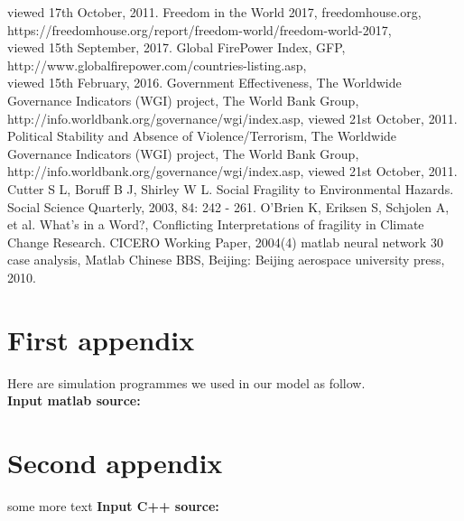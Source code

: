 \documentclass{mcmthesis}
\begin{document}
\begin{thebibliography}{99}
viewed 17th October, 2011.
 Freedom in the World 2017, freedomhouse.org,\\ 
https://freedomhouse.org/report/freedom-world/freedom-world-2017, \\ 
viewed 15th September, 2017.
 Global FirePower Index, GFP,
http://www.globalfirepower.com/countries-listing.asp, \\ 
viewed 15th February, 2016.
 Government Effectiveness, The Worldwide Governance 
Indicators (WGI) project, The World Bank Group, 
http://info.worldbank.org/governance/wgi/index.asp, viewed 21st October, 2011.
 Political Stability and Absence of Violence/Terrorism, 
The Worldwide Governance Indicators (WGI) project, The World Bank Group, \\
http://info.worldbank.org/governance/wgi/index.asp, viewed 21st October, 2011.
 Cutter S L, Boruff B J, Shirley W L. Social 
Fragility to Environmental Hazards. Social Science 
Quarterly, 2003, 84: 242 - 261.
 O’Brien K, Eriksen S, Schjolen A, et al. What’s in a Word?, 
Conflicting Interpretations of fragility in Climate Change Research. CICERO Working Paper, 2004(4)
 matlab neural network 30 case analysis, Matlab Chinese BBS, Beijing: Beijing aerospace university press, 2010.
\end{thebibliography}

\begin{appendices}

\section{First appendix}

\lipsum[13]

Here are simulation programmes we used in our model as follow.\\

\textbf{\textcolor[rgb]{0.98,0.00,0.00}{Input matlab source:}}


\section{Second appendix}

some more text \textcolor[rgb]{0.98,0.00,0.00}{\textbf{Input C++ source:}}


\end{appendices}
\end{document}

